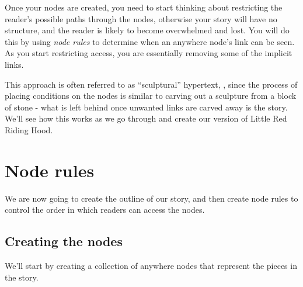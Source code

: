 \documentclass{article}
\begin{document}
Once your nodes are created, you need to start thinking about restricting the reader's possible paths through the nodes, otherwise your story will have no structure, and the reader is likely to become overwhelmed and lost. You will do this by using \textit{node rules} to determine when an anywhere node's link can be seen. As you start restricting access, you are essentially removing some of the implicit links.

This approach is often referred to as ``sculptural'' hypertext,
\cite{Bernstein:2001aa,Bernstein:2002aa}, since the process of placing conditions on the nodes is similar to carving out a sculpture from a block of stone - what is left behind once unwanted links are carved away is the story. We'll see how this works as we go through and create our version of Little Red Riding Hood.

\section{Node rules}

We are now going to create the outline of our story, and then create node rules to control the order in which readers can access the nodes.

\subsection{Creating the nodes}

We'll start by creating a collection of anywhere nodes that represent the pieces in the story. 
\end{document}
